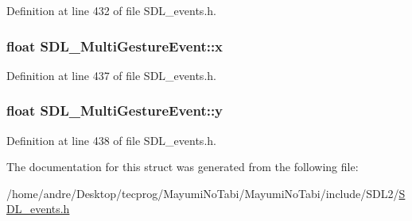 Definition at line 432 of file S\-D\-L\-\_\-events.\-h.

\hypertarget{struct_s_d_l___multi_gesture_event_a1708fc3c788fd12cc0beb5dc05cf31ca}{
\subsubsection[{x}]{\setlength{\rightskip}{0pt plus 5cm}float S\-D\-L\-\_\-\-Multi\-Gesture\-Event\-::x}}\label{struct_s_d_l___multi_gesture_event_a1708fc3c788fd12cc0beb5dc05cf31ca}


Definition at line 437 of file S\-D\-L\-\_\-events.\-h.

\hypertarget{struct_s_d_l___multi_gesture_event_a264602b9c5cc027eb6a283adda428454}{
\subsubsection[{y}]{\setlength{\rightskip}{0pt plus 5cm}float S\-D\-L\-\_\-\-Multi\-Gesture\-Event\-::y}}\label{struct_s_d_l___multi_gesture_event_a264602b9c5cc027eb6a283adda428454}


Definition at line 438 of file S\-D\-L\-\_\-events.\-h.



The documentation for this struct was generated from the following file\-:\begin{DoxyCompactItemize}
\item 
/home/andre/\-Desktop/tecprog/\-Mayumi\-No\-Tabi/\-Mayumi\-No\-Tabi/include/\-S\-D\-L2/\hyperlink{_s_d_l__events_8h}{S\-D\-L\-\_\-events.\-h}\end{DoxyCompactItemize}

